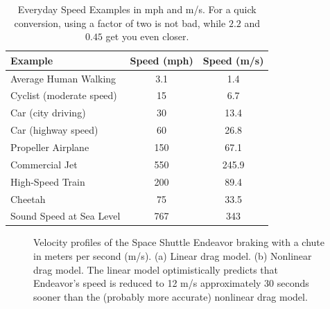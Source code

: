 \begin{table}[h!]
\centering
\caption{Everyday Speed Examples in mph and m/s. For a quick conversion, using a factor of two is not bad, while $2.2$ and $0.45$ get you even closer.}
\begin{tabular}{@{}lcc@{}}
\toprule
\textbf{Example} & \textbf{Speed (mph)} & \textbf{Speed (m/s)} \\ \midrule
Average Human Walking & 3.1 & 1.4 \\
Cyclist (moderate speed) & 15 & 6.7 \\
Car (city driving) & 30 & 13.4 \\
Car (highway speed) & 60 & 26.8 \\
Propeller Airplane & 150 & 67.1 \\
Commercial Jet & 550 & 245.9 \\
High-Speed Train & 200 & 89.4 \\
Cheetah & 75 & 33.5 \\
Sound Speed at Sea Level & 767 & 343 \\
\bottomrule
\end{tabular}
\end{table}

\bigskip

\begin{figure}[htb]%
\centering
{}%
\hfill
{}%
\hfill
    \caption[]{Velocity profiles of the Space Shuttle Endeavor braking with a chute in meters per second (m/s). (a) Linear drag model. (b) Nonlinear drag model. The linear model optimistically predicts that Endeavor's speed is reduced to 12 m/s approximately 30 seconds sooner than the (probably more accurate) nonlinear drag model.}
    \label{fig:SpaceShuttleDragChutes}
\end{figure}


